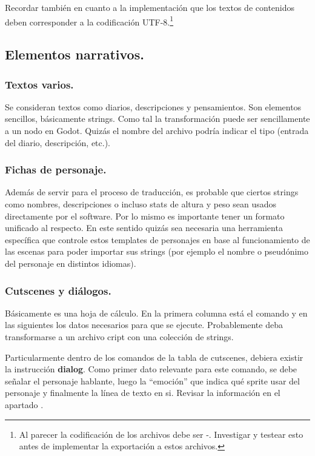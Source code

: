 Recordar también en cuanto a la implementación que los textos de contenidos deben corresponder a la codificación UTF-8.\footnote{Al parecer la codificación de los archivos  debe ser -. Investigar y testear esto antes de implementar la exportación a estos archivos.}

\subsection{Elementos narrativos.}\label{kit:elementos-narrativos}

\subsubsection{Textos varios.}\label{kit:textos-varios}
Se consideran textos como diarios, descripciones y pensamientos. Son elementos sencillos, básicamente strings. Como tal la transformación puede ser sencillamente a un nodo en Godot. Quizás el nombre del archivo podría indicar el tipo (entrada del diario, descripción, etc.). 

\subsubsection{Fichas de personaje.}\label{kit:fichas-de-personaje}
Además de servir para el proceso de traducción, es probable que ciertos strings como nombres, descripciones o incluso stats de altura y peso sean usados directamente por el software. Por lo mismo es importante tener un formato unificado al respecto. En este sentido quizás sea necesaria una herramienta específica que controle estos templates de personajes en base al funcionamiento de las escenas para poder importar sus strings (por ejemplo el nombre o pseudónimo del personaje en distintos idiomas).

\subsubsection{Cutscenes y diálogos.}\label{kit:cutscenes-y-dialogos}
Básicamente es una hoja de cálculo. En la primera columna está el comando y en las siguientes los datos necesarios para que se ejecute. Probablemente deba transformarse a un archivo cript con una colección de strings.

Particularmente dentro de los comandos de la tabla de cutscenes, debiera existir la instrucción \textbf{dialog}. Como primer dato relevante para este comando, se debe señalar el personaje hablante, luego la “emoción” que indica qué sprite usar del personaje y finalmente la línea de texto en si. Revisar la información en el apartado .

